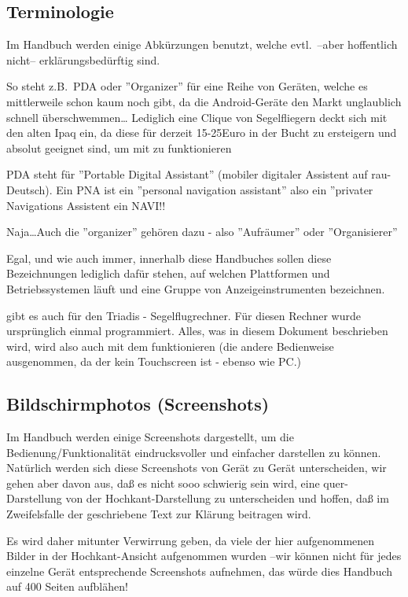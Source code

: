 \subsection*{Terminologie}
Im Handbuch werden einige Abkürzungen benutzt, welche evtl.\ --aber hoffentlich nicht--  erklärungsbedürftig sind.

So  steht z.B.\  PDA oder ''Organizer'' für eine Reihe von Geräten, welche es mittlerweile schon kaum noch
gibt, da die Android-Geräte den Markt unglaublich schnell überschwemmen\dots
{\small Lediglich eine Clique von Segelfliegern deckt sich mit den alten Ipaq ein, da diese für derzeit 15-25Euro in der Bucht
zu ersteigern und absolut geeignet sind, um mit \xc zu funktionieren}

PDA steht für ''Portable Digital Assistant'' (mobiler digitaler Assistent auf rau-Deutsch).
Ein PNA ist ein ''personal navigation assistant'' also ein ''privater Navigations Assistent ein NAVI!!

Naja\dots Auch die ''organizer'' gehören dazu - also ''Aufräumer'' oder ''Organisierer''

Egal, und wie auch immer, innerhalb diese Handbuches sollen diese Bezeichnungen lediglich dafür stehen,
auf welchen Plattformen und Betriebssystemen \xc läuft und eine Gruppe von Anzeigeinstrumenten bezeichnen.

\xc gibt es auch für den Triadis \al - Segelflugrechner.
Für diesen Rechner wurde \xc ursprünglich einmal programmiert. Alles, was in diesem Dokument beschrieben wird, wird also auch
mit dem \al funktionieren (die andere Bedienweise ausgenommen, da der \al kein Touchscreen ist - ebenso wie PC.)

\subsection*{Bildschirmphotos (Screenshots)}

Im Handbuch werden einige Screenshots dargestellt, um die Bedienung/Funktionalität eindrucksvoller und einfacher darstellen zu können.
Natürlich werden sich diese Screenshots von Gerät zu Gerät unterscheiden, wir gehen aber davon aus, daß es nicht sooo
schwierig sein wird, eine quer-Darstellung  von der Hochkant-Darstellung zu unterscheiden und hoffen, daß im Zweifelsfalle der geschriebene
Text zur Klärung  beitragen wird.

Es wird daher mitunter Verwirrung geben, da viele der hier aufgenommenen Bilder in der Hochkant-Ansicht aufgenommen wurden
--wir können nicht für jedes einzelne Gerät entsprechende Screenshots aufnehmen, das würde dies Handbuch auf 400 Seiten aufblähen!

